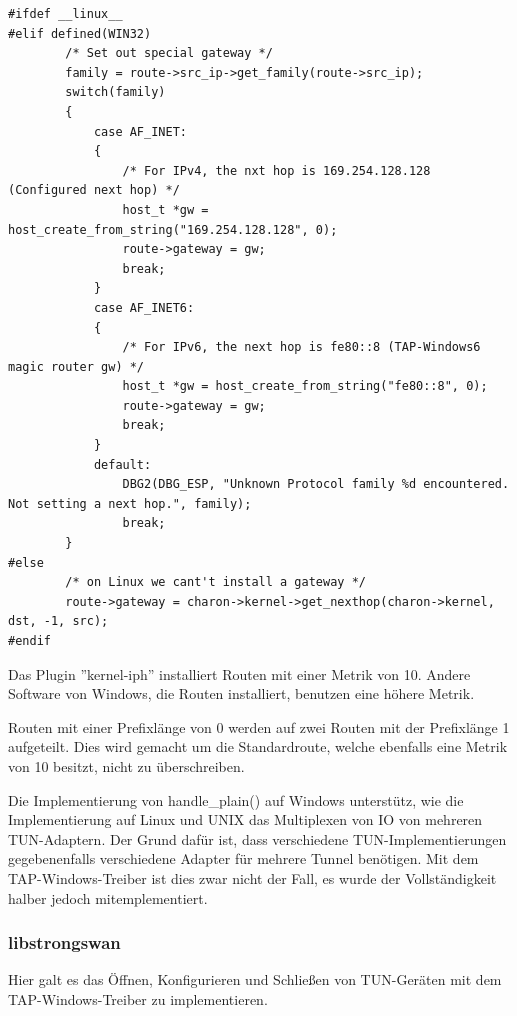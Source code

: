 {\begin{lstlisting}[caption=Patch für die Routen-Installation von libipsec]
#ifdef __linux__
#elif defined(WIN32)
        /* Set out special gateway */
        family = route->src_ip->get_family(route->src_ip);
        switch(family)
        {
            case AF_INET:
            {
                /* For IPv4, the nxt hop is 169.254.128.128 (Configured next hop) */
                host_t *gw = host_create_from_string("169.254.128.128", 0);
                route->gateway = gw;
                break;
            }
            case AF_INET6:
            {
                /* For IPv6, the next hop is fe80::8 (TAP-Windows6 magic router gw) */
                host_t *gw = host_create_from_string("fe80::8", 0);
                route->gateway = gw;
                break;
            }
            default:
                DBG2(DBG_ESP, "Unknown Protocol family %d encountered. Not setting a next hop.", family);
                break;
        }
#else
        /* on Linux we cant't install a gateway */
        route->gateway = charon->kernel->get_nexthop(charon->kernel, dst, -1, src);
#endif
\end{lstlisting}

Das Plugin ''kernel-iph'' installiert Routen mit einer Metrik von 10.
Andere Software von Windows, die Routen installiert, benutzen eine höhere Metrik.

Routen mit einer Prefixlänge von 0 werden auf zwei Routen mit der Prefixlänge 1 aufgeteilt.
Dies wird gemacht um die Standardroute, welche ebenfalls eine Metrik von 10 besitzt,
nicht zu überschreiben.

Die Implementierung von handle\_plain() auf Windows unterstütz, wie die Implementierung
auf Linux und UNIX das Multiplexen von IO von mehreren TUN-Adaptern. Der Grund dafür ist,
dass verschiedene TUN-Implementierungen gegebenenfalls verschiedene Adapter für mehrere Tunnel
benötigen. Mit dem TAP-Windows-Treiber ist dies zwar nicht der Fall, es wurde der Vollständigkeit
halber jedoch mitemplementiert.

\subsubsection{libstrongswan}
Hier galt es das Öffnen, Konfigurieren und Schließen von TUN-Geräten
mit dem TAP-Windows-Treiber zu implementieren.

}
